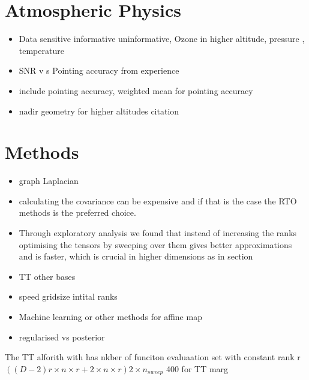\section{Atmospheric Physics}
\begin{itemize}
	\item Data sensitive informative uninformative, Ozone in higher altitude, pressure , temperature
	\item SNR v s Pointing accuracy from experience
	\item include pointing accuracy, weighted mean for pointing accuracy
	\item nadir geometry for higher altitudes citation
\end{itemize}

\section{Methods}
\begin{itemize}
	\item graph Laplacian
	\item calculating the covariance can be expensive and if that is the case the RTO methods is the preferred choice.
	\item Through exploratory analysis we found that instead of increasing the ranks optimising the tensors by sweeping over them gives better approximations and is faster, which is crucial in higher dimensions as in section
	\item TT other bases
	\item speed gridsize intital ranks
	\item Machine learning or other methods for affine map
	\item regularised vs posterior
\end{itemize}

The TT alforith with has nkber of funciton evaluaation set with constant rank r 
$( (D-2) r \times n\times r + 2  \times n \times r)2 \times n_{sweep}$
400 for TT marg